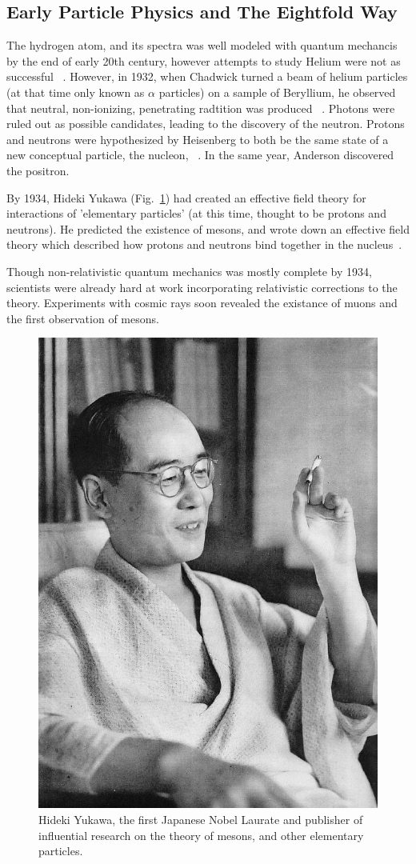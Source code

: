 \clearpage
\subsection{Early Particle Physics and The Eightfold Way}

The hydrogen atom, and its spectra was well modeled with quantum mechancis by
the end of early 20th century, however attempts to study Helium were not as
successful ~\needcite{}. However, in 1932,  when Chadwick turned a beam of
helium particles (at that time only known as $\alpha$ particles) on a sample of
Beryllium, he observed that neutral, non-ionizing, penetrating radtition was
produced ~\cite{KraussParticleHistory}. Photons were ruled out as possible
candidates, leading to the discovery of the neutron. Protons and neutrons were
hypothesized by Heisenberg to both be the same state of a new conceptual
particle, the nucleon, ~\cite{Heisenberg1952}. In the same year, Anderson
discovered the positron. 

By 1934, Hideki Yukawa (Fig.~\ref{fig:hidekiyukawa}) had created an effective
field theory for interactions of 'elementary particles' (at this time, thought
to be protons and neutrons). He predicted the existence of mesons, and wrote
down an effective field theory which described how protons and neutrons bind
together in the nucleus~\cite{Yukawa1935}. 

Though non-relativistic quantum mechanics was mostly complete by 1934,
scientists were already hard at work incorporating relativistic corrections to
the theory. Experiments with cosmic rays soon revealed the existance of muons
and the first observation of mesons.

\begin{figure}[ht]
	\begin{center}
		\includegraphics[width=0.5\linewidth]{../Chapter2/fig/hidekiyukawa.jpg}
	\caption{
		Hideki Yukawa, the first Japanese Nobel Laurate and publisher of influential
		research on the theory of mesons, and other elementary particles.
	}
	\label{fig:hidekiyukawa}
\end{center}
\end{figure}

